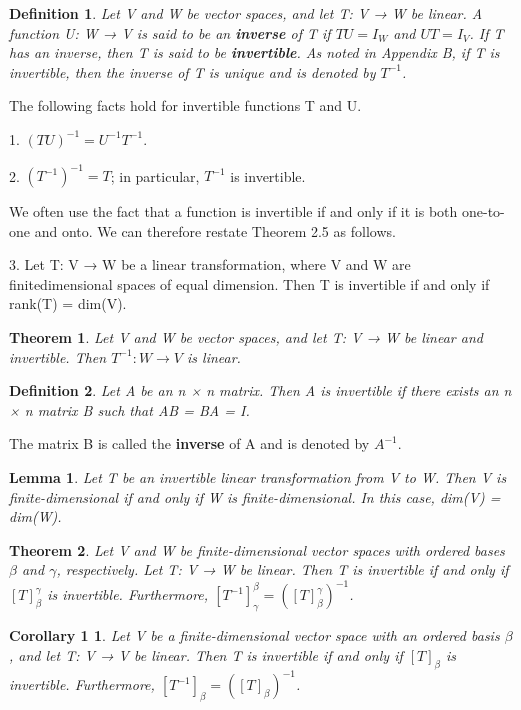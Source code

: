 \documentclass{article}
\newcommand{\bd}[1]{\textbf{#1}}
\theoremstyle{plain}
\newtheorem{theorem}{Theorem}[section]
\newtheorem*{lemma1}{Lemma}
\newtheorem*{corollary1}{Corollary 1}
\newtheorem*{definition1}{Definition}
\theoremstyle{plain} %
\begin{document}
\begin{definition1}
Let V and W be vector spaces, and let T: V → W be linear. A function U: W → V is said to be an \bd{inverse} of T if $TU = I_W$ and $UT = I_V$. If T has an inverse, then T is said to be \bd{invertible}. As noted in Appendix B, if T is invertible, then the inverse of T is unique and is denoted by $T^{-1}$.
\end{definition1}

The following facts hold for invertible functions T and U.

1. $(TU)^{-1} = U^{-1}T^{-1}$.

2. $(T^{-1})^{-1} = T$; in particular, $T^{-1}$ is invertible.

We often use the fact that a function is invertible if and only if it is both
one-to-one and onto. We can therefore restate Theorem 2.5 as follows.

3. Let T: V → W be a linear transformation, where V and W are finitedimensional spaces of equal dimension. Then T is invertible if and only if rank(T) = dim(V).

\begin{theorem}
Let V and W be vector spaces, and let T: V → W be linear and invertible. Then $T^{-1} : W \to V$ is linear.
\end{theorem}

\begin{definition1}
Let A be an n × n matrix. Then A is invertible if there exists an n × n matrix B such that AB = BA = I.
\end{definition1}

The matrix B is called the \bd{inverse} of A and is denoted by $A^{-1}$.

\begin{lemma1}
Let T be an invertible linear transformation from V to W. Then V is finite-dimensional if and only if W is finite-dimensional. In this case, dim(V) = dim(W).
\end{lemma1}

\begin{theorem}
Let V and W be finite-dimensional vector spaces with ordered bases $\beta$ and $\gamma$, respectively. Let T: V → W be linear. Then T is invertible if and only if $[T]_\beta^\gamma$ is invertible. Furthermore, $[T^{-1}]_\gamma^\beta = ([T]_\beta^\gamma)^{-1}$.
\end{theorem}

\begin{corollary1}
Let V be a finite-dimensional vector space with an ordered basis $\beta$, and let T: V → V be linear. Then T is invertible if and only if $[T]_\beta$ is invertible. Furthermore, $[T^{-1}]_\beta = ([T]_\beta)^{-1}$.
\end{corollary1}
\end{document}
